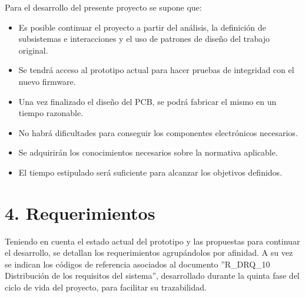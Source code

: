 \documentclass[11pt]{charter}
\begin{document}
Para el desarrollo del presente proyecto se supone que:

\begin{itemize}
\item Es posible continuar el proyecto a partir del análisis, la definición de subsistemas e interacciones y el uso de patrones
de diseño del trabajo original.
\item Se tendrá acceso al prototipo actual para hacer pruebas de integridad con el nuevo firmware.
\item Una vez finalizado el diseño del PCB, se podrá fabricar el mismo en un tiempo razonable. 
\item No habrá dificultades para conseguir los componentes electrónicos necesarios.
\item Se adquirirán los conocimientos necesarios sobre la normativa aplicable.
\item El tiempo estipulado será suficiente para alcanzar los objetivos definidos.
\end{itemize}

\section{4. Requerimientos}
\label{sec:requerimientos}

Teniendo en cuenta el estado actual del prototipo y las propuestas para continuar el desarrollo, se detallan los requerimientos
agrupándolos por afinidad. A su vez se indican los códigos de referencia asociados al documento ''R\_DRQ\_10 Distribución de los requisitos del sistema'',
desarrollado durante la quinta fase del ciclo de vida del proyecto, para facilitar su trazabilidad.
\end{document}

